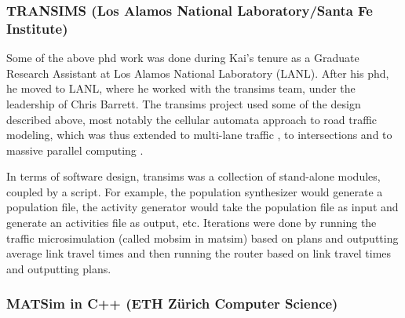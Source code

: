 \subsubsection{TRANSIMS (Los Alamos National Laboratory/Santa Fe Institute)}
\label{sec:history-lanl-phase}
Some of the above \acrshort{phd} work was done during Kai's tenure as a Graduate Research Assistant at Los Alamos National Laboratory (LANL).  After his \acrshort{phd}, he moved to LANL, where he worked with the \gls{transims} \citep[see, e.g.,][]{SmithEtc1995TRANSIMSSeattle} team, under the leadership of Chris Barrett.
%
The \gls{transims} project used some of the design described above, most notably the cellular automata approach to road traffic modeling, which was thus extended to multi-lane traffic \citep{NagelWolfEtAl1998TwoLaneSystematic}, to intersections \citep{NagelEtc1997flow-char} and to massive parallel computing \citep{NagelRickert2001parallel}.


In terms of software design, \gls{transims} was a collection of stand-alone modules, coupled by a script.  For example, the population synthesizer would generate a population file, the activity generator would take the population file as input and generate an activities file as output, etc.  Iterations were done by running 
the traffic \gls{microsimulation} (called \gls{mobsim} in \gls{matsim})
based on plans and outputting average link travel times and then running the router based on link travel times and outputting plans.

\subsubsection{MATSim in C++ (ETH Zürich Computer Science)}
\label{sec:history-ethz-phase}

